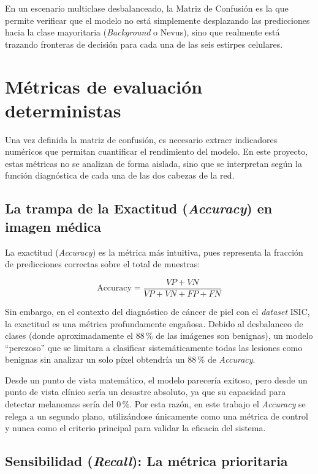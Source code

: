 En un escenario multiclase desbalanceado, la Matriz de Confusión es la que permite verificar que el modelo no está simplemente desplazando las predicciones hacia la clase mayoritaria (\textit{Background} o Nevus), sino que realmente está trazando fronteras de decisión para cada una de las seis estirpes celulares.

\section{Métricas de evaluación deterministas}

Una vez definida la matriz de confusión, es necesario extraer indicadores numéricos que permitan cuantificar el rendimiento del modelo. En este proyecto, estas métricas no se analizan de forma aislada, sino que se interpretan según la función diagnóstica de cada una de las dos cabezas de la red.

\subsection{La trampa de la Exactitud (\textit{Accuracy}) en imagen médica}

La exactitud (\textit{Accuracy}) es la métrica más intuitiva, pues representa la fracción de predicciones correctas sobre el total de muestras:

\begin{equation}
	\text{Accuracy} = \frac{VP + VN}{VP + VN + FP + FN}
\end{equation}

Sin embargo, en el contexto del diagnóstico de cáncer de piel con el \textit{dataset} ISIC, la exactitud es una métrica profundamente engañosa. Debido al desbalanceo de clases (donde aproximadamente el 88\,\% de las imágenes son benignas), un modelo ``perezoso'' que se limitara a clasificar sistemáticamente todas las lesiones como benignas sin analizar un solo píxel obtendría un 88\,\% de \textit{Accuracy}.

Desde un punto de vista matemático, el modelo parecería exitoso, pero desde un punto de vista clínico sería un desastre absoluto, ya que su capacidad para detectar melanomas sería del 0\,\%. Por esta razón, en este trabajo el \textit{Accuracy} se relega a un segundo plano, utilizándose únicamente como una métrica de control y nunca como el criterio principal para validar la eficacia del sistema.



\subsection{Sensibilidad (\textit{Recall}): La métrica prioritaria}

